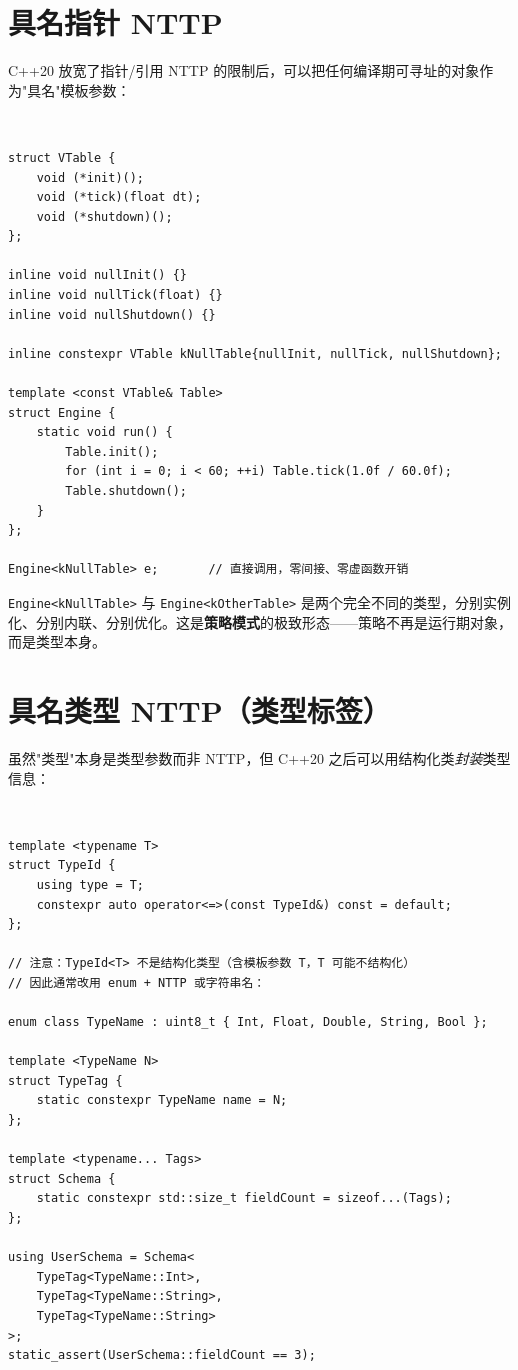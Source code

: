 \documentclass[12pt,a4paper,fontset=fandol]{ctexbook}
\newcommand{\cppxxlabel}[1]{%
  \tcbox[on line,colback=cpp20bg,colframe=cpp20bg,
    boxrule=0pt,arc=1pt,left=2pt,right=2pt,top=1pt,bottom=1pt,
    colupper=white,fontupper=\scriptsize\bfseries]{#1}}
\newcommand{\cpp}[1]{C++#1}
\newcommand{\kw}[1]{\texttt{#1}}
\begin{document}
\section{具名指针 NTTP}

\cpp{20} 放宽了指针/引用 NTTP 的限制后，可以把任何编译期可寻址的对象作为"具名"模板参数：

\cppxxlabel{C++20}\ \begin{lstlisting}
struct VTable {
    void (*init)();
    void (*tick)(float dt);
    void (*shutdown)();
};

inline void nullInit() {}
inline void nullTick(float) {}
inline void nullShutdown() {}

inline constexpr VTable kNullTable{nullInit, nullTick, nullShutdown};

template <const VTable& Table>
struct Engine {
    static void run() {
        Table.init();
        for (int i = 0; i < 60; ++i) Table.tick(1.0f / 60.0f);
        Table.shutdown();
    }
};

Engine<kNullTable> e;       // 直接调用，零间接、零虚函数开销
\end{lstlisting}

\kw{Engine<kNullTable>} 与 \kw{Engine<kOtherTable>} 是两个完全不同的类型，分别实例化、分别内联、分别优化。这是\textbf{策略模式}的极致形态——策略不再是运行期对象，而是类型本身。

\section{具名类型 NTTP（类型标签）}

虽然"类型"本身是类型参数而非 NTTP，但 \cpp{20} 之后可以用结构化类\emph{封装}类型信息：

\cppxxlabel{C++20}\ \begin{lstlisting}
template <typename T>
struct TypeId {
    using type = T;
    constexpr auto operator<=>(const TypeId&) const = default;
};

// 注意：TypeId<T> 不是结构化类型（含模板参数 T，T 可能不结构化）
// 因此通常改用 enum + NTTP 或字符串名：

enum class TypeName : uint8_t { Int, Float, Double, String, Bool };

template <TypeName N>
struct TypeTag {
    static constexpr TypeName name = N;
};

template <typename... Tags>
struct Schema {
    static constexpr std::size_t fieldCount = sizeof...(Tags);
};

using UserSchema = Schema<
    TypeTag<TypeName::Int>,
    TypeTag<TypeName::String>,
    TypeTag<TypeName::String>
>;
static_assert(UserSchema::fieldCount == 3);
\end{lstlisting}
\end{document}

